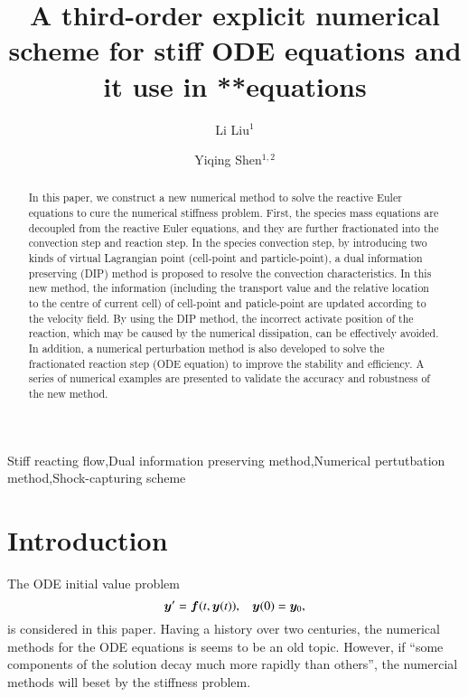\documentclass[review]{elsarticle}
\theoremstyle{plain}\newtheorem{definition}{\sc{Definition}}
\theoremstyle{defination}\newtheorem{example}{Example}[section]
\numberwithin{equation}{section}
\numberwithin{table}{section}
\begin{document}
\title{A third-order explicit numerical scheme for stiff ODE equations and it use in **equations }
\author{Li Liu$^1$}
\author{Yiqing Shen$^{1,2}$ }
\address{$^1$LHD, Institute of Mechanics, Chinese Academy of Sciences, Beijing 100190, China}
\address{$^2$School of Engineering Science, University of Chinese Academy of Sciences, Beijing 100049, China}
{
\begin{abstract}
In this paper, we construct a new numerical method to solve the reactive Euler equations to cure the numerical stiffness problem.
First, the species mass equations are decoupled from the reactive Euler equations, and they are further fractionated into the convection step and reaction step.
 In the species convection
step, by introducing two kinds of virtual Lagrangian point (cell-point and particle-point), a dual information preserving (DIP) method is proposed to resolve the convection characteristics. In this new method, the 
 information (including the transport value and the relative location to the centre of current cell) of cell-point and paticle-point are updated according to the velocity field. By using the DIP method, the incorrect activate position of the reaction, which may be caused by the numerical dissipation, can be effectively avoided. In addition, a numerical perturbation method is also developed to solve the fractionated reaction step (ODE equation) to improve the stability and efficiency. A series of numerical examples are presented to validate the accuracy and robustness of the new method. 
\end{abstract}
\begin{keyword}
 Stiff reacting flow\sep  Dual information preserving method\sep Numerical pertutbation method\sep Shock-capturing scheme 
\end{keyword}

\maketitle
\section{Introduction}

The ODE initial value problem
\begin{equation}\label{eq:ode}
  \bm{y}'= \bm{f}(t,\bm{y}(t)), \hspace{0.3cm} \bm{y}(0)= \bm{y}_0,
  \end{equation}
  is considered in this paper. 
 Having a history over two centuries, the numerical methods for the ODE equations is seems to be an old topic. However,  if ``some components of the solution decay much more rapidly than others'', the numercial methods will beset by the stiffness problem.     


}
\end{document}
